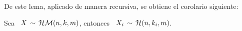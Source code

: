 De este lema, aplicado de manera recursiva, se obtiene el corolario siguiente:
%
\begin{corolario}\label{Cor:MP:MarginalMultinomial}
%
  Sea  \ $X  \,  \sim \,  \mathcal{H}\mathcal{M}(n,k,m)$, entonces  \  $\displaystyle X_i  \, \sim  \,
  \mathcal{H}(n,k_i,m)$.
\end{corolario}



